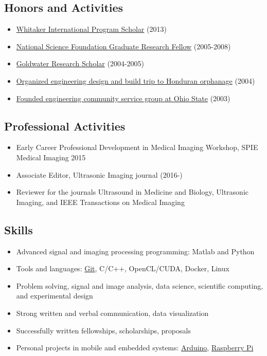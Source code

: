 \documentclass[
]{article}
\providecommand{\tightlist}{%
  \setlength{\itemsep}{0pt}\setlength{\parskip}{0pt}}
\begin{document}
\hypertarget{honors-and-activities}{%
\subsection{Honors and Activities}\label{honors-and-activities}}

\begin{itemize}
\tightlist
\item
  \href{http://www.whitaker.org/grants/fellows-scholars}{Whitaker
  International Program Scholar} (2013)
\item
  \href{http://www.nsfgrfp.org/}{National Science Foundation Graduate
  Research Fellow} (2005-2008)
\item
  \href{https://goldwater.scholarsapply.org/}{Goldwater Research
  Scholar} (2004-2005)
\item
  \href{http://www.montanadeluz.org/}{Organized engineering design and
  build trip to Honduran orphanage} (2004)
\item
  \href{http://ecos.osu.edu/}{Founded engineering community service
  group at Ohio State} (2003)
\end{itemize}

\hypertarget{professional-activities}{%
\subsection{Professional Activities}\label{professional-activities}}

\begin{itemize}
\tightlist
\item
  Early Career Professional Development in Medical Imaging Workshop,
  SPIE Medical Imaging 2015
\item
  Associate Editor, Ultrasonic Imaging journal (2016-)
\item
  Reviewer for the journals Ultrasound in Medicine and Biology,
  Ultrasonic Imaging, and IEEE Transactions on Medical Imaging
\end{itemize}

\hypertarget{skills}{%
\subsection{Skills}\label{skills}}

\begin{itemize}
\tightlist
\item
  Advanced signal and imaging processing programming: Matlab and Python
\item
  Tools and languages: \href{http://git-scm.com/}{Git}, C/C++,
  OpenCL/CUDA, Docker, Linux
\item
  Problem solving, signal and image analysis, data science, scientific
  computing, and experimental design
\item
  Strong written and verbal communication, data visualization
\item
  Successfully written fellowships, scholarships, proposals
\item
  Personal projects in mobile and embedded systems:
  \href{http://www.arduino.cc/}{Arduino},
  \href{http://www.raspberrypi.org/}{Raspberry Pi}
\end{itemize}
\end{document}
